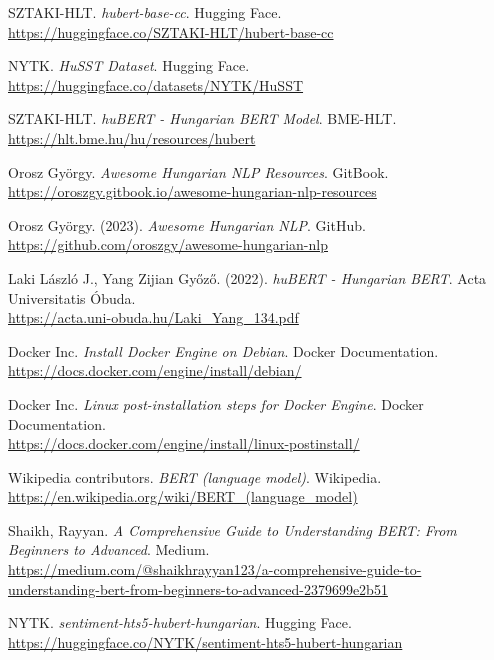 \documentclass[12pt]{article}
\begin{document}
\begin{thebibliography}

SZTAKI-HLT. \textit{hubert-base-cc}. Hugging Face. \\
\url{https://huggingface.co/SZTAKI-HLT/hubert-base-cc}

NYTK. \textit{HuSST Dataset}. Hugging Face. \\
\url{https://huggingface.co/datasets/NYTK/HuSST}

SZTAKI-HLT. \textit{huBERT - Hungarian BERT Model}. BME-HLT. \\
\url{https://hlt.bme.hu/hu/resources/hubert}

Orosz György. \textit{Awesome Hungarian NLP Resources}. GitBook. \\
\url{https://oroszgy.gitbook.io/awesome-hungarian-nlp-resources}

Orosz György. (2023). \textit{Awesome Hungarian NLP}. GitHub. \\
\url{https://github.com/oroszgy/awesome-hungarian-nlp}

Laki László J., Yang Zijian Győző. (2022). \textit{huBERT - Hungarian BERT}. Acta Universitatis Óbuda. \\
\url{https://acta.uni-obuda.hu/Laki_Yang_134.pdf}

Docker Inc. \textit{Install Docker Engine on Debian}. Docker Documentation. \\
\url{https://docs.docker.com/engine/install/debian/}

Docker Inc. \textit{Linux post-installation steps for Docker Engine}. Docker Documentation. \\
\url{https://docs.docker.com/engine/install/linux-postinstall/}

Wikipedia contributors. \textit{BERT (language model)}. Wikipedia. \\
\url{https://en.wikipedia.org/wiki/BERT_(language_model)}

Shaikh, Rayyan. \textit{A Comprehensive Guide to Understanding BERT: From Beginners to Advanced}. Medium. \\
\url{https://medium.com/@shaikhrayyan123/a-comprehensive-guide-to-understanding-bert-from-beginners-to-advanced-2379699e2b51}

NYTK. \textit{sentiment-hts5-hubert-hungarian}. Hugging Face. \\
\url{https://huggingface.co/NYTK/sentiment-hts5-hubert-hungarian}

\end{thebibliography}
\end{document}
